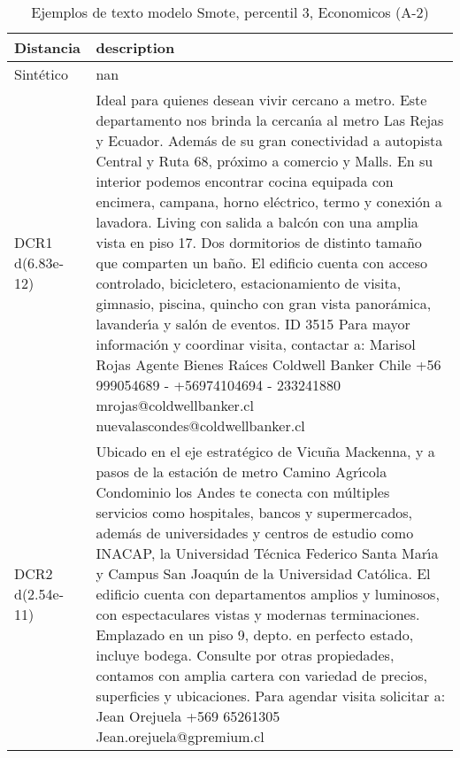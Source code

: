 \begin{table}[H]
\centering
\fontsize{10}{14}\selectfont
\caption{Ejemplos de texto modelo Smote, percentil 3, Economicos (A-2)}
\label{table-example-economicos-a-2-smote-enc-3p-text}
\begin{tabular}{|l|m{35em}|}
\hline
\rowcolor[gray]{0.8}
Distancia & description \\
\hline Sintético & nan \\
\hline DCR1 d(6.83e-12) & Ideal para quienes desean vivir cercano a metro. Este departamento nos brinda la cercan{\'\i}a al metro Las Rejas y Ecuador. Adem\'as de su gran conectividad a autopista Central y Ruta 68, pr\'oximo a comercio y Malls.
En su interior podemos encontrar cocina equipada con encimera, campana, horno el\'ectrico, termo y conexi\'on a lavadora.
Living con salida a balc\'on con una amplia vista en piso 17.
Dos dormitorios de distinto tama\~no que comparten un ba\~no.
El  edificio cuenta con acceso controlado, bicicletero, estacionamiento de visita, gimnasio, piscina, quincho con gran vista panor\'amica, lavander{\'\i}a y sal\'on de eventos.
ID 3515
Para mayor informaci\'on y coordinar visita, contactar a:
Marisol Rojas
Agente Bienes Ra{\'\i}ces Coldwell Banker Chile
+56 999054689 - +56974104694 - 233241880
mrojas@coldwellbanker.cl
nuevalascondes@coldwellbanker.cl \\
\hline DCR2 d(2.54e-11) & Ubicado en el eje estrat\'egico de Vicu\~na Mackenna, y a pasos de la estaci\'on de metro Camino Agr{\'\i}cola Condominio los Andes te conecta con m\'ultiples servicios como hospitales, bancos y supermercados, adem\'as de universidades y centros de estudio como INACAP, la Universidad T\'ecnica Federico Santa Mar{\'\i}a y Campus San Joaqu{\'\i}n de la Universidad Cat\'olica. El edificio cuenta con departamentos amplios y luminosos, con espectaculares vistas y modernas terminaciones. Emplazado en un piso 9, depto. en perfecto estado, incluye bodega.  Consulte por otras propiedades, contamos con amplia cartera con variedad de precios, superficies y ubicaciones. Para agendar visita solicitar a: Jean Orejuela +569 65261305 Jean.orejuela@gpremium.cl \\
\hline
\end{tabular}
\end{table}
